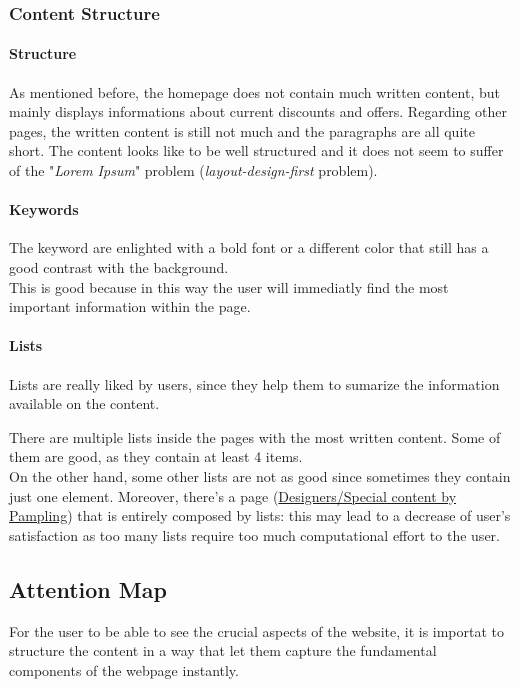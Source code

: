 \subsubsection{Content Structure}
\paragraph{Structure}
As mentioned before, the homepage does not contain much written content, but mainly displays informations about current discounts
and offers.
Regarding other pages, the written content is still not much and the paragraphs are all quite short. 
The content looks like to be well structured and it does not seem to suffer of the "\textit{Lorem Ipsum}" 
problem (\textit{layout-design-first} problem). \\

\paragraph{Keywords}
The keyword are enlighted with a bold font or a different color that still has a good contrast with the background.\\
This is good because in this way the user will immediatly find the most important information within the page.

\paragraph{Lists}
Lists are really liked by users, since they help them to sumarize the information available on the content.

There are multiple lists inside the pages with the most written content. Some of them are good, as they contain
at least 4 items. \\
On the other hand, some other lists are not as good since sometimes they contain just one element. 
Moreover, there's a page (\href{https://www.pampling.com/}{Designers/Special content by Pampling}) that is 
entirely composed by lists: this may lead to a decrease of user's satisfaction as too many lists require too much computational
effort to the user.

\subsection{Attention Map}
For the user to be able to see the crucial aspects of the website, it is importat to structure the content in a way that let
them capture the fundamental components of the webpage instantly.

